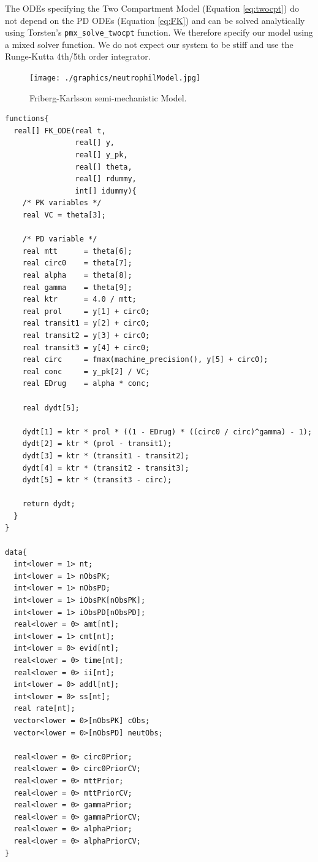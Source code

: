 \documentclass[10pt, reqno, oneside]{amsbook}
\numberwithin{equation}{chapter}
\numberwithin{figure}{chapter}
\numberwithin{table}{chapter}
\theoremstyle{remark}
\begin{document}
The ODEs specifying the Two Compartment Model
(Equation \eqref{eq:twocpt}) do not depend on the PD ODEs
(Equation \eqref{eq:FK}) and can be solved analytically
using Torsten's \texttt{pmx_solve_twocpt} function. We
therefore specify our model using a mixed solver function. We do not
expect our system to be stiff and use the Runge-Kutta 4th/5th order
integrator.

\begin{figure}[htbp]
\centering
\texttt{[image: ./graphics/neutrophilModel.jpg]}
\caption{\label{FK_model}
Friberg-Karlsson semi-mechanistic Model.}
\end{figure}

\begin{verbatim}
functions{
  real[] FK_ODE(real t,
                real[] y,
                real[] y_pk,
                real[] theta,
                real[] rdummy,
                int[] idummy){
    /* PK variables */
    real VC = theta[3];

    /* PD variable */
    real mtt      = theta[6];
    real circ0    = theta[7];
    real alpha    = theta[8];
    real gamma    = theta[9];
    real ktr      = 4.0 / mtt;
    real prol     = y[1] + circ0;
    real transit1 = y[2] + circ0;
    real transit2 = y[3] + circ0;
    real transit3 = y[4] + circ0;
    real circ     = fmax(machine_precision(), y[5] + circ0);
    real conc     = y_pk[2] / VC;
    real EDrug    = alpha * conc;

    real dydt[5];

    dydt[1] = ktr * prol * ((1 - EDrug) * ((circ0 / circ)^gamma) - 1);
    dydt[2] = ktr * (prol - transit1);
    dydt[3] = ktr * (transit1 - transit2);
    dydt[4] = ktr * (transit2 - transit3);
    dydt[5] = ktr * (transit3 - circ);

    return dydt;
  }
}

data{
  int<lower = 1> nt;
  int<lower = 1> nObsPK;
  int<lower = 1> nObsPD;
  int<lower = 1> iObsPK[nObsPK];
  int<lower = 1> iObsPD[nObsPD];
  real<lower = 0> amt[nt];
  int<lower = 1> cmt[nt];
  int<lower = 0> evid[nt];
  real<lower = 0> time[nt];
  real<lower = 0> ii[nt];
  int<lower = 0> addl[nt];
  int<lower = 0> ss[nt];
  real rate[nt];
  vector<lower = 0>[nObsPK] cObs;
  vector<lower = 0>[nObsPD] neutObs;

  real<lower = 0> circ0Prior;
  real<lower = 0> circ0PriorCV;
  real<lower = 0> mttPrior;
  real<lower = 0> mttPriorCV;
  real<lower = 0> gammaPrior;
  real<lower = 0> gammaPriorCV;
  real<lower = 0> alphaPrior;
  real<lower = 0> alphaPriorCV;
}


\end{verbatim}
\end{document}
